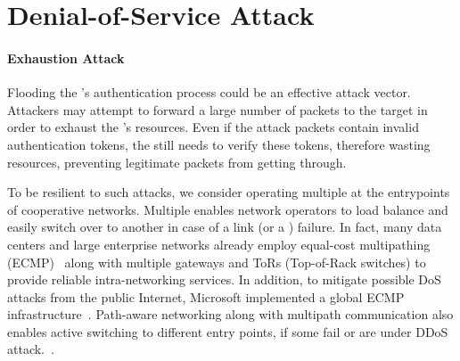 
\section{Denial-of-Service Attack}
\label{sec:disrupting}

\paragraph{Exhaustion Attack}
Flooding the \tp's authentication process could be an effective attack vector. Attackers
may attempt to forward a large number of packets to the target \tp in order to exhaust the
\tp's resources. Even if the attack packets contain invalid authentication tokens, the \tp still
needs to verify these tokens, therefore wasting resources, preventing legitimate packets from getting through.

To be resilient to such attacks, we consider operating multiple \tps at the entrypoints
of cooperative networks. Multiple \tps enables network operators
to load balance and easily switch over to another \tp in case of a link (or a \tp)
failure. In fact, many data centers and large enterprise networks already employ equal-cost
multipathing (ECMP)~\cite{rfc2991,rfc2992} along with multiple gateways and ToRs (Top-of-Rack
switches) to provide reliable intra-networking services. In addition, to mitigate possible DoS
attacks from the public Internet, Microsoft implemented a global ECMP
infrastructure~\cite{ms2020ecmp}. Path-aware networking along with multipath communication
also enables active switching to different entry points, if some fail or are under DDoS attack.~\cite{Dawkins2018,Trammell2018}.


